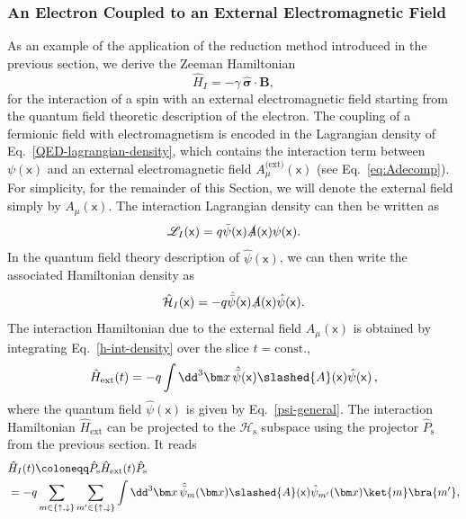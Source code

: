 \documentclass[letterpaper,12pt,titlepage,oneside,final]{book}
\newcommand{\mf}{\mathsf}%
\begin{document}
\subsubsection*{An Electron Coupled to an External Electromagnetic Field}\label{sec:coupleExtMag}

As an example of the application of the reduction method introduced in the previous section, we derive the Zeeman Hamiltonian 
\begin{equation}
    \hat{H}_I = - \gamma\, \hat{\bm \sigma}\cdot \bm B,\label{eq:ZeemanBase}
\end{equation} 
for the interaction of a spin with an external electromagnetic field starting from the quantum field theoretic description of the electron. The coupling of a fermionic field with electromagnetism is encoded in the Lagrangian density of Eq.~\eqref{QED-lagrangian-density}, which contains the interaction term between $\psi(\mf x)$ and an external electromagnetic field $A^{\text{(ext)}}_\mu(\mf x)$ (see Eq.~\eqref{eq:Adecomp}). For simplicity, for the remainder of this Section, we will denote the external field simply by $A_\mu(\mf x)$. The interaction Lagrangian density can then be written as
\begin{equation}
    \mathscr{L}_I(\mf x) = q\bar{\psi}(\mf x) \slashed{A}(\mf x)\psi(\mf x).
\end{equation}
In the quantum field theory description of $\hat{\psi}(\mf x)$, we can then write the associated Hamiltonian density as
\begin{equation}\label{h-int-density}
    \hat{\mathcal{H}}_I(\mf x) = - 
 q\hat{\bar{\psi}}(\mf x) \slashed{A}(\mf x)\hat{\psi}(\mf x).
\end{equation}
The interaction Hamiltonian due to the external field $A_{\mu}(\mf x)$ is obtained by integrating Eq.~\eqref{h-int-density} over the slice $t = \text{const}.$,
\begin{equation}\label{H-interaction}
    \hat{H}_{\text{ext}}(t) = -  q\int \dd^3 \bm x \,\hat{\bar{\psi}}(\mf{x})\slashed{A}(\mf x)\hat{\psi}(\mf{x})\,,
\end{equation}
where the quantum field $\hat{\psi}(\mf x)$ is given by Eq.~\eqref{psi-general}. The interaction Hamiltonian $\hat{H}_\text{ext}$ can be projected to the $\mathscr{H}_\text{s}$ subspace using the projector $\hat{P}_\text{s}$ from the previous section. It reads
\begin{align}\label{zeeman-non-reduced}
    &\hat{H}_I(t) \coloneqq \hat{P}_\text{s}\hat{H}_{\text{ext}}(t)\hat{P}_\text{s} \\
    &= -  q\sum_{m \in \{\uparrow, \downarrow\}} \sum_{ m' \in \{\uparrow, \downarrow\}}  \int \dd^3 \bm x\, \hat{\bar{\psi}}_m(\bm x)\slashed{A}(\mf x)\hat{{\psi}}_{m'}(\bm x)\ket{m}\bra{m'}\nonumber,
\end{align}
\end{document}
